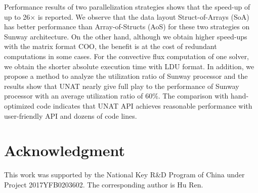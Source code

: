 \documentclass[5p,times]{elsarticle}
\begin{document}
Performance results of two parallelization strategies shows that the speed-up of up to 26$\times$ is reported. We observe that the data layout Struct-of-Arrays (SoA) has better performance than Array-of-Structs (AoS) for these two strategies on Sunway architecture. On the other hand, although we obtain higher speed-ups with the matrix format COO, the benefit is at the cost of redundant computations in some cases. For the convective flux computation of one solver, we obtain the shorter absolute execution time with LDU format. In addition, we propose a method to analyze the utilization ratio of Sunway processor and the results show that UNAT nearly give full play to the performance of Sunway processor with an average utilization ratio of 60\%. The comparison with hand-optimized code indicates that UNAT API achieves reasonable performance with user-friendly API and dozens of code lines.





\section{Acknowledgment}

This work was supported by the National Key R\&D Program  of China under Project 2017YFB0203602. The corresponding author is Hu Ren.
\end{document}
